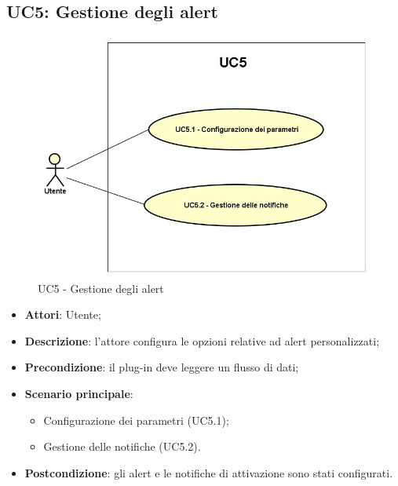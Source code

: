 \subsection{UC5: Gestione degli alert}
\hypertarget{UC5}{}
\begin{figure} [H]
	\centering
	\includegraphics[scale=0.45]{Img/UC5}
	\caption{UC5 - Gestione degli alert}\label{}
\end{figure}
\begin{itemize}
	\item \textbf{Attori}: Utente;
	\item \textbf{Descrizione}: l'attore configura le opzioni relative ad alert personalizzati;
	\item \textbf{Precondizione}: il plug-in deve leggere un flusso di dati;
	\item \textbf{Scenario principale}:
	\begin{itemize}
		\item Configurazione dei parametri (UC5.1);
		\item Gestione delle notifiche (UC5.2).
	\end{itemize}
	\item \textbf{Postcondizione}: gli alert e le notifiche di attivazione sono stati configurati.
\end{itemize}

